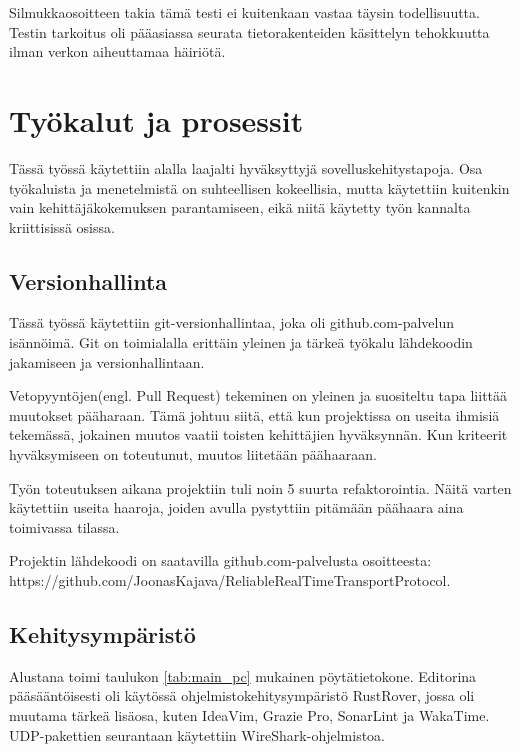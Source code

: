 \documentclass[a4paper,12pt]{article}
\begin{document}
Silmukkaosoitteen takia tämä testi ei kuitenkaan vastaa täysin todellisuutta.
Testin tarkoitus oli pääasiassa seurata tietorakenteiden käsittelyn tehokkuutta ilman
verkon aiheuttamaa häiriötä.


    \section{Työkalut ja prosessit}
    Tässä työssä käytettiin alalla laajalti hyväksyttyjä sovelluskehitystapoja. Osa työkaluista ja menetelmistä on suhteellisen kokeellisia, mutta käytettiin kuitenkin vain kehittäjäkokemuksen parantamiseen, eikä niitä käytetty työn kannalta kriittisissä osissa.

    \subsection{Versionhallinta}
    Tässä työssä käytettiin git-versionhallintaa, joka oli github.com-palvelun isännöimä. Git on toimialalla erittäin yleinen ja tärkeä työkalu lähdekoodin jakamiseen ja versionhallintaan. \par

    Vetopyyntöjen(engl. Pull Request) tekeminen on yleinen ja suositeltu tapa liittää muutokset pääharaan. Tämä johtuu siitä, että kun projektissa on useita ihmisiä tekemässä, jokainen muutos vaatii toisten kehittäjien hyväksynnän. Kun kriteerit hyväksymiseen on toteutunut,
    muutos liitetään päähaaraan.\par

    Työn toteutuksen aikana projektiin tuli noin 5 suurta refaktorointia.
    Näitä varten käytettiin useita haaroja, joiden avulla pystyttiin pitämään päähaara aina toimivassa tilassa. \par

    Projektin lähdekoodi on saatavilla github.com-palvelusta osoitteesta:
    https://github.com/JoonasKajava/ReliableRealTimeTransportProtocol.

    \subsection{Kehitysympäristö}


    Alustana toimi taulukon \ref{tab:main_pc} mukainen pöytätietokone.
    Editorina pääsääntöisesti oli käytössä ohjelmistokehitysympäristö RustRover, jossa oli muutama tärkeä lisäosa, kuten IdeaVim, Grazie Pro, SonarLint ja WakaTime.
    UDP-pakettien seurantaan käytettiin WireShark-ohjelmistoa.
\end{document}
